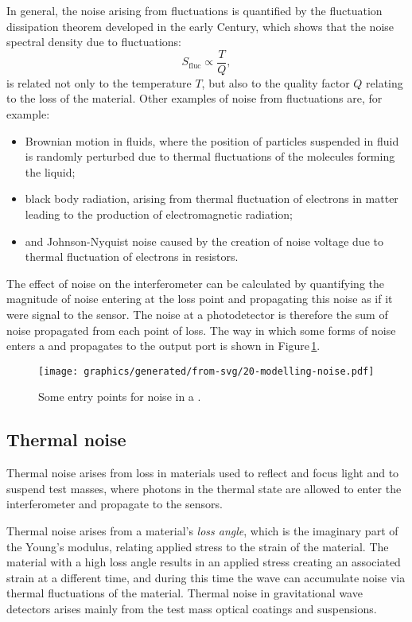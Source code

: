 In general, the noise arising from fluctuations is quantified by the fluctuation dissipation theorem developed in the early  Century, which shows that the noise spectral density due to fluctuations:
\begin{equation}
  S_{\text{fluc}} \propto \frac{T}{Q},
\end{equation}
is related not only to the temperature $T$, but also to the quality factor $Q$ relating to the loss of the material. Other examples of noise from fluctuations are, for example:
\begin{itemize}
  \item Brownian motion in fluids, where the position of particles suspended in fluid is randomly perturbed due to thermal fluctuations of the molecules forming the liquid;
  \item black body radiation, arising from thermal fluctuation of electrons in matter leading to the production of electromagnetic radiation;
  \item and Johnson-Nyquist noise caused by the creation of noise voltage due to thermal fluctuation of electrons in resistors.
\end{itemize}

The effect of noise on the interferometer can be calculated by quantifying the magnitude of noise entering at the loss point and propagating this noise as if it were signal to the sensor. The noise at a photodetector is therefore the sum of noise propagated from each point of loss. The way in which some forms of noise enters a \DRFPMI{} and propagates to the output port is shown in Figure\,\ref{fig:modelling-noise}.

\begin{figure}
  \centering
  \texttt{[image: graphics/generated/from-svg/20-modelling-noise.pdf]}
  \caption[Some entry points for noise in a \DRFPMI{}]{\label{fig:modelling-noise}Some entry points for noise in a \DRFPMI{}. }
\end{figure}

\subsection{Thermal noise}
Thermal noise arises from loss in materials used to reflect and focus light and to suspend test masses, where photons in the thermal state are allowed to enter the interferometer and propagate to the sensors.

Thermal noise arises from a material's \emph{loss angle}, which is the imaginary part of the Young's modulus, relating applied stress to the strain of the material. The material with a high loss angle results in an applied stress creating an associated strain at a different time, and during this time the wave can accumulate noise via thermal fluctuations of the material. Thermal noise in gravitational wave detectors arises mainly from the test mass optical coatings and suspensions.

